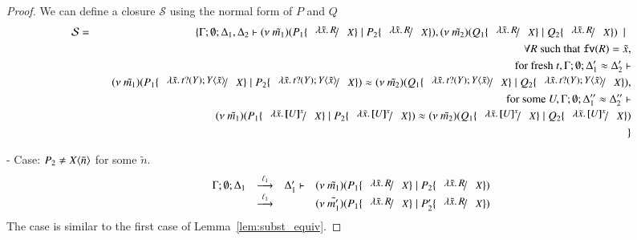 \begin{proof}
	We can define a closure $\mathcal{S}$ using the normal form of $P$ and $Q$
	\begin{eqnarray*}
		\mathcal{S} &=& \set{\horel{\Gamma}{\Delta_1}{\newsp{\tilde{m_1}}{P_1 \subst{\abs{\tilde{x}}{R}}{X} \Par P_2 \subst{\abs{\tilde{x}}{R}}{X}}}{,}{\Delta_2}{\newsp{\tilde{m_2}}{Q_1 \subst{\abs{\tilde{x}}{R}}{X} \Par Q_2 \subst{\abs{\tilde{x}}{R}}{X}}} \setbar \\
		&& \quad \forall R \textrm{ such that } \fv{R} = \tilde{x},\\
		&& \quad \textrm{ for fresh } t, \Gamma; \es; \Delta_1' \wb \Delta_2' \proves \\
		&& \quad \newsp{\tilde{m_1}}{P_1 \subst{\abs{\tilde{x}}{\binp{t}{Y} \appl{Y}{\tilde{x}}}}{X} \Par P_2 \subst{\abs{\tilde{x}}{\binp{t}{Y} \appl{Y}{\tilde{x}}}}{X}} \wb \newsp{\tilde{m_2}}{Q_1 \subst{\abs{\tilde{x}}{\binp{t}{Y} \appl{Y}{\tilde{x}}}}{X} \Par Q_2 \subst{\abs{\tilde{x}}{\binp{t}{Y} \appl{Y}{\tilde{x}}}}{X}}, \\
		&& \quad \textrm{ for some } U, \Gamma; \es; \Delta_1'' \wb \Delta_2'' \proves \\
		&& \quad \newsp{\tilde{m_1}}{P_1 \subst{\abs{\tilde{x}}{\map{U}^x}}{X} \Par P_2 \subst{\abs{\tilde{x}}{\map{U}^x}}{X}} \wb \newsp{\tilde{m_2}}{Q_1 \subst{\abs{\tilde{x}}{\map{U}^x}}{X} \Par Q_2 \subst{\abs{\tilde{x}}{\map{U}^x}}{X}} \\
		&&}
	\end{eqnarray*}

	\noi - Case: $P_2 \not= X\langle \tilde{n} \rangle$ for some $\tilde{n}$.
%
\[
	\mhorel	{\Gamma}{\Delta_1}{\newsp{\tilde{m_1}}{P_1 \subst{\abs{\tilde{x}}{R}}{X} \Par P_2 \subst{\abs{\tilde{x}}{R}}{X}}}
		{\by{\ell_1}}
		{\Delta_1'}{}{\newsp{\tilde{m_1'}}{P_1 \subst{\abs{\tilde{x}}{R}}{X} \Par P_2' \subst{\abs{\tilde{x}}{R}}{X}}}
\]
%
	\noi The case is similar to the first case of Lemma~\ref{lem:subst_equiv}.


\end{proof}
